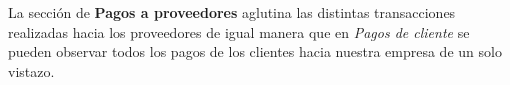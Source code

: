 La sección de \textbf{Pagos a proveedores} aglutina las distintas transacciones realizadas hacia los proveedores de igual manera que en \emph{Pagos de cliente} se pueden observar todos los pagos de los clientes hacia nuestra empresa de un solo vistazo.






































